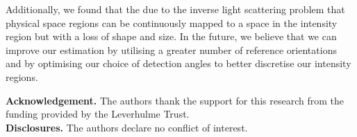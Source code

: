 \documentclass[final,  3p]{elsarticle}
\begin{document}
Additionally, we found that the due to the inverse light scattering problem that physical space regions can be continuously mapped to a space in the intensity region but with a loss of shape and size. In the future, we believe that we can improve our estimation by utilising a greater number of reference orientations and by optimising our choice of detection angles to better discretise our intensity regions. 

\noindent \textbf{Acknowledgement.} The authors thank the support for this research from the funding provided by the Leverhulme Trust. \\
  
\noindent \textbf{Disclosures.} The authors declare no conflict of interest. \\


 


\newpage
\appendix
\onecolumn
\end{document}
